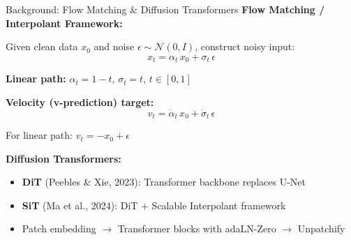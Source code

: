 \documentclass[aspectratio=169, 10pt]{beamer}
\begin{document}
\begin{frame}{Background: Flow Matching \& Diffusion Transformers}
\textbf{Flow Matching / Interpolant Framework:}

Given clean data $x_0$ and noise $\epsilon \sim \mathcal{N}(0, I)$, construct noisy input:
\begin{equation}
  x_t = \alpha_t \, x_0 + \sigma_t \, \epsilon
\end{equation}

\textbf{Linear path:} $\alpha_t = 1 - t$, \; $\sigma_t = t$, \quad $t \in [0, 1]$

\vspace{0.5em}
\textbf{Velocity (v-prediction) target:}
\begin{equation}
  v_t = \dot{\alpha}_t \, x_0 + \dot{\sigma}_t \, \epsilon
\end{equation}

For linear path: $v_t = -x_0 + \epsilon$

\vspace{0.5em}
\textbf{Diffusion Transformers:}
\begin{itemize}
  \item \textbf{DiT} (Peebles \& Xie, 2023): Transformer backbone replaces U-Net
  \item \textbf{SiT} (Ma et al., 2024): DiT + Scalable Interpolant framework
  \item Patch embedding $\rightarrow$ Transformer blocks with adaLN-Zero $\rightarrow$ Unpatchify
\end{itemize}
\end{frame}
\end{document}
